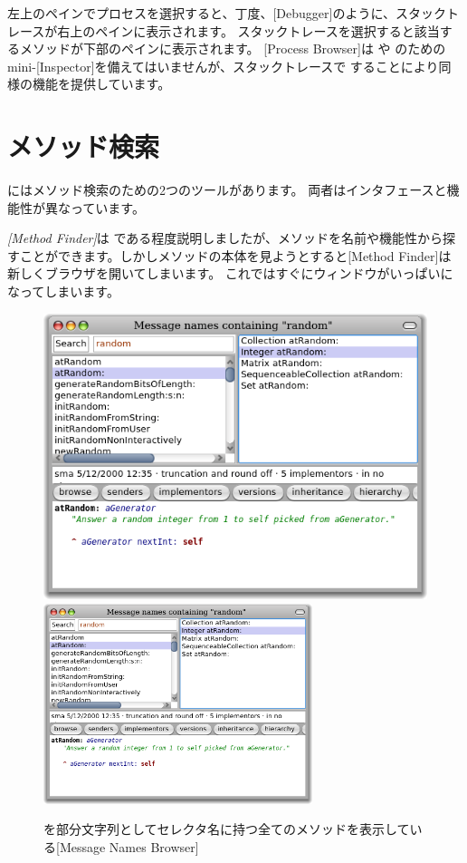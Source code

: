 \documentclass[a4paper,10pt,twoside]{book}
\begin{document}
左上のペインでプロセスを選択すると、丁度、[Debugger]のように、スタックトレースが右上のペインに表示されます。
スタックトレースを選択すると該当するメソッドが下部のペインに表示されます。
[Process Browser]は \self や  のためのmini-[Inspector]を備えてはいませんが、スタックトレースで  することにより同様の機能を提供しています。

\section{メソッド検索}

\pharo にはメソッド検索のための2つのツールがあります。
両者はインタフェースと機能性が異なっています。

\emph{[Method Finder]}は  である程度説明しましたが、メソッドを名前や機能性から探すことができます。しかしメソッドの本体を見ようとすると[Method Finder]は新しくブラウザを開いてしまいます。
これではすぐにウィンドウがいっぱいになってしまいます。

\begin{figure}[btp]
	\begin{center}
	\ifluluelse
		{\includegraphics[width=\textwidth]{methodNamesRandom}}
		{\includegraphics[width=0.7\textwidth]{methodNamesRandom}}
	\end{center}
	\caption{ を部分文字列としてセレクタ名に持つ全てのメソッドを表示している[Message Names Browser]}
\end{figure}
\end{document}
